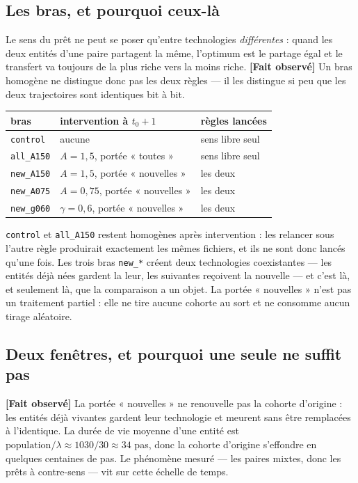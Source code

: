 \documentclass[11pt,a4paper]{article}
\newcommand{\code}[1]{\texttt{#1}}
\newcommand{\fait}{\textbf{[Fait observé]}}
\begin{document}
\subsection{Les bras, et pourquoi ceux-là}

Le sens du prêt ne peut se poser qu'entre technologies \emph{différentes} :
quand les deux entités d'une paire partagent la même, l'optimum est le partage
égal et le transfert va toujours de la plus riche vers la moins riche. \fait{}
Un bras homogène ne distingue donc pas les deux règles --- il les distingue si
peu que les deux trajectoires sont identiques bit à bit.

\begin{center}\footnotesize
\begin{tabular}{@{}lll@{}}
\toprule
\textbf{bras} & \textbf{intervention à $t_0+1$} & \textbf{règles lancées} \\
\midrule
\code{control} & aucune & sens libre seul \\
\code{all\_A150} & $A = 1{,}5$, portée « toutes » & sens libre seul \\
\code{new\_A150} & $A = 1{,}5$, portée « nouvelles » & les deux \\
\code{new\_A075} & $A = 0{,}75$, portée « nouvelles » & les deux \\
\code{new\_g060} & $\gamma = 0{,}6$, portée « nouvelles » & les deux \\
\bottomrule
\end{tabular}
\end{center}

\noindent \code{control} et \code{all\_A150} restent homogènes après
intervention : les relancer sous l'autre règle produirait exactement les mêmes
fichiers, et ils ne sont donc lancés qu'une fois. Les trois bras
\code{new\_*} créent deux technologies coexistantes --- les entités déjà nées
gardent la leur, les suivantes reçoivent la nouvelle --- et c'est là, et
seulement là, que la comparaison a un objet. La portée « nouvelles » n'est pas
un traitement partiel : elle ne tire aucune cohorte au sort et ne consomme
aucun tirage aléatoire.

\subsection{Deux fenêtres, et pourquoi une seule ne suffit pas}
\label{sec:fenetres}

\fait{} La portée « nouvelles » ne renouvelle pas la cohorte d'origine : les
entités déjà vivantes gardent leur technologie et meurent sans être remplacées
à l'identique. La durée de vie moyenne d'une entité est
$\text{population}/\lambda \approx 1030/30 \approx 34$ pas, donc la cohorte
d'origine s'effondre en quelques centaines de pas. Le phénomène mesuré ---
les paires mixtes, donc les prêts à contre-sens --- vit sur cette échelle de
temps.
\end{document}
